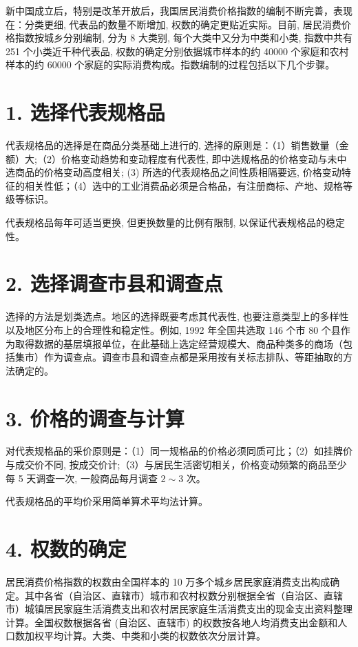 \documentclass[10pt]{article}
\begin{document}
\begin{CJK*}{UTF8}{bsmi}
新中国成立后，特别是改革开放后，我国居民消费价格指数的编制不断完善，表现在：分类更细, 代表品的数量不断增加, 权数的确定更贴近实际。目前, 居民消费价格指数按城乡分别编制, 分为 8 大类别, 每个大类中又分为中类和小类, 指数中共有 251 个小类近千种代表品, 权数的确定分别依据城市样本的约 40000 个家庭和农村样本的约 60000 个家庭的实际消费构成。指数编制的过程包括以下几个步骤。

\section*{1. 选择代表规格品}
代表规格品的选择是在商品分类基础上进行的, 选择的原则是：（1）销售数量（金额）大;（2）价格变动趋势和变动程度有代表性, 即中选规格品的价格变动与未中选商品的价格变动高度相关; (3) 所选的代表规格品之间性质相隔要远, 价格变动特征的相关性低；（4）选中的工业消费品必须是合格品，有注册商标、产地、规格等级等标识。

代表规格品每年可适当更换, 但更换数量的比例有限制, 以保证代表规格品的稳定性。

\section*{2. 选择调查市县和调查点}
选择的方法是划类选点。地区的选择既要考虑其代表性, 也要注意类型上的多样性以及地区分布上的合理性和稳定性。例如, 1992 年全国共选取 146 个市 80 个县作为取得数据的基层填报单位，在此基础上选定经营规模大、商品种类多的商场（包括集市）作为调查点。调查市县和调查点都是采用按有关标志排队、等距抽取的方法确定的。

\section*{3. 价格的调查与计算}
对代表规格品的采价原则是：（1）同一规格品的价格必须同质可比；（2）如挂牌价与成交价不同, 按成交价计;（3）与居民生活密切相关，价格变动频繁的商品至少每 5 天调查一次, 一般商品每月调查 $2 \sim 3$ 次。

代表规格品的平均价采用简单算术平均法计算。

\section*{4. 权数的确定}
居民消费价格指数的权数由全国样本的 10 万多个城乡居民家庭消费支出构成确定。其中各省（自治区、直辖市）城市和农村权数分别根据全省（自治区、直辖市）城镇居民家庭生活消费支出和农村居民家庭生活消费支出的现金支出资料整理计算。全国权数根据各省 (自治区、直辖市) 的权数按各地人均消费支出金额和人口数加权平均计算。大类、中类和小类的权数依次分层计算。


\end{CJK*}
\end{document}
